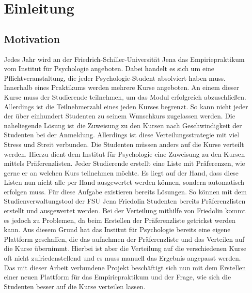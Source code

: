 \chapter{Einleitung}
\label{chapter:introduction}

    \section{Motivation}
    \label{sec:motivation}
        Jedes Jahr wird an der Friedrich-Schiller-Universität Jena das Empiriepraktikum vom Institut für Psychologie angeboten.
        Dabei handelt es sich um eine Pflichtveranstaltung, die jeder Psychologie-Student absolviert haben muss.
        Innerhalb eines Praktikums werden mehrere Kurse angeboten.
        An einem dieser Kurse muss der Studierende teilnehmen, um das Modul erfolgreich abzuschließen.
        Allerdings ist die Teilnehmerzahl eines jeden Kurses begrenzt.
        So kann nicht jeder der über einhundert Studenten zu seinem Wunschkurs zugelassen werden.
        Die naheliegende Lösung ist die Zuweisung zu den Kursen nach Geschwindigkeit der Studenten bei der Anmeldung.
        Allerdings ist diese Verteilungsstrategie mit viel Stress und Streit verbunden.
        Die Studenten müssen anders auf die Kurse verteilt werden.
        Hierzu dient dem Institut für Psychologie eine Zuweisung zu den Kursen mittels Präferenzlisten.
        Jeder Studierende erstellt eine Liste mit Präferenzen, wie gerne er an welchen Kurs teilnehmen möchte.
        Es liegt auf der Hand, dass diese Listen nun nicht alle per Hand ausgewertet werden können, sondern automatisch erfolgen muss.
        Für diese Aufgabe existieren bereits Lösungen.
        So können mit dem Studienverwaltungstool der FSU Jena Friedolin Studenten bereits Präferenzlisten erstellt und ausgewertet werden.
        Bei der Verteilung mithilfe von Friedolin kommt es jedoch zu Problemen, da beim Erstellen der Präferenzliste getrickst werden kann.
        Aus diesem Grund hat das Institut für Psychologie bereits eine eigene Plattform geschaffen, die das aufnehmen der Präferenzliste und das Verteilen auf die Kurse übernimmt.
        Hierbei ist aber die Verteilung auf die verschiedenen Kurse oft nicht zufriedenstellend und es muss manuell das Ergebnis angepasst werden.
        Das mit dieser Arbeit verbundene Projekt beschäftigt sich nun mit dem Erstellen einer neuen Plattform für das Empiriepraktikum und der Frage, wie sich die Studenten besser auf die Kurse verteilen lassen.
        

